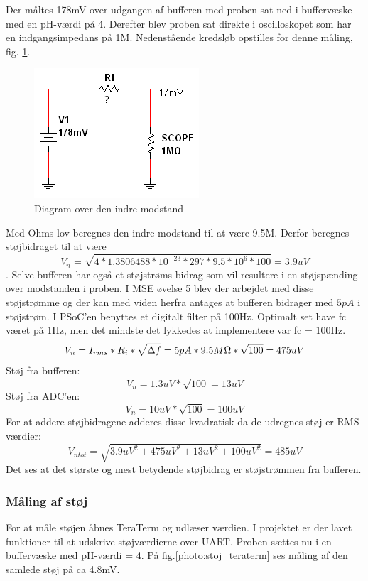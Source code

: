 Der måltes 178mV over udgangen af bufferen med proben sat ned i buffervæske med en pH-værdi på 4. Derefter blev proben sat direkte i oscilloskopet som har en indgangsimpedans på 1M\ohm . Nedenstående kredsløb opstilles for denne måling, fig. \ref{photo:Kredslob_RI}. 


 \begin{figure}[H]
	\centering 
	\includegraphics[scale=1]{HardwareArkitektur/Sensore/pH_probe_billeder/Kredslob_RI.png}
	\caption{Diagram over den indre modstand}
	\label{photo:Kredslob_RI}
\end{figure} 

Med Ohms-lov beregnes den indre modstand til at være 9.5M\ohm . Derfor beregnes støjbidraget til at være
$$ V_n = \sqrt{4*1.3806488*10^{-23}*297*9.5*10^{6}*100} = 3.9uV $$.
Selve bufferen har også et støjstrøms bidrag som vil resultere i en støjspænding over modstanden i proben. I MSE øvelse 5 blev der arbejdet med disse støjstrømme og der kan med viden herfra antages at bufferen bidrager med $5pA$ i støjstrøm. I PSoC'en benyttes et digitalt filter på 100Hz. Optimalt set have fc været på 1Hz, men det mindste det lykkedes at implementere var fc = 100Hz.
$$ V_n = I_{rms}*R_i*\sqrt{\Delta f} = 5pA*9.5M\ohm *\sqrt{100} = 475uV $$
Støj fra bufferen:
$$ V_n = 1.3uV * \sqrt{100} = 13uV $$
Støj fra ADC'en:
$$ V_n = 10uV * \sqrt{100} = 100uV $$
For at addere støjbidragene adderes disse kvadratisk da de udregnes støj er RMS-værdier:
$$ V_{ntot} = \sqrt{3.9uV^2 + 475uV^2 + 13uV^2 + 100uV^2} = 485uV $$
Det ses at det største og mest betydende støjbidrag er støjstrømmen fra bufferen.\newline 

\subsubsection{Måling af støj}

For at måle støjen åbnes TeraTerm og udlæser værdien. I projektet er der lavet funktioner til at udskrive støjværdierne over UART. Proben sættes nu i en buffervæske med pH-værdi = 4. På fig.\ref{photo:stoj_teraterm} ses måling af den samlede støj på ca 4.8mV.

